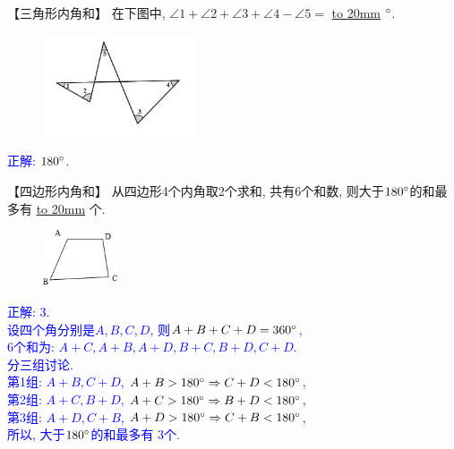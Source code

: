 \item {
    【三角形内角和】
    {在下图中, $\angle 1 + \angle 2 + \angle 3 + \angle 4 - \angle 5=$ \underline{\hbox to 20mm{}} $\degree$.} 
    \begin{figure}[H] 
        \centering
        \includegraphics[width=0.4\textwidth]{./pics/Chapter_2/9.png}
    \end{figure}
    \ifshowSolution 
        \fangsong{}\textcolor{blue}{
            正解: $180\degree$. \\
        }
    \else
        \vspace{1cm}
    \fi
}

\item {
    【四边形内角和】
    从四边形4个内角取2个求和, 共有6个和数, 则大于$180\degree$的和最多有 \underline{\hbox to 20mm{}} 个.
    \begin{figure}[H] 
        \centering
        \includegraphics[width=0.2\textwidth]{./pics/Chapter_2/11.png}
    \end{figure}
    \ifshowSolution 
        \fangsong{}\textcolor{blue}{
            正解: 3.\\
            设四个角分别是$A,B,C,D$, 则$A+B+C+D = 360\degree$, \\
            6个和为: $A+C, A+B, A+D, B+C, B+D, C+D$. \\
            分三组讨论.\\
            第1组: $A+B, C+D$, $A+B > 180\degree \Rightarrow C+D < 180\degree$, \\
            第2组: $A+C,B+D$, $A+C > 180\degree \Rightarrow B+D < 180\degree$, \\
            第3组: $A+D,C+B$, $A+D > 180\degree \Rightarrow C+B < 180\degree$, \\
            所以, 大于$180\degree$的和最多有 3个.
        }
    \else
        \vspace{1cm}
    \fi
}
